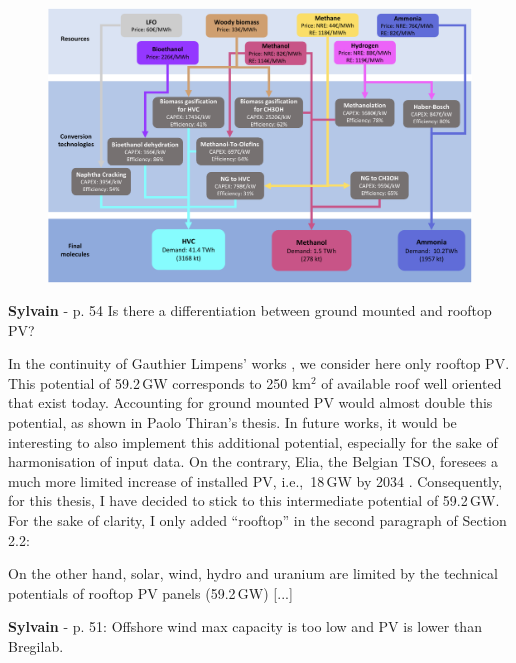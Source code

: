 \documentclass[12pt,a4paper]{article}
\def\ie{i.e.,\ }
\begin{document}
\begin{figure}[htbp!]
\centering
\includegraphics[width=\textwidth]{NED_tech.pdf}
\label{fig:NED_tech}
\end{figure}

\begin{mdframed}[style=comment] %
{\color{purple} \textbf{Sylvain}} - p. 54 Is there a differentiation between ground mounted and rooftop PV?
\end{mdframed}

\noindent In the continuity of Gauthier Limpens' works \cite{limpens2021generating}, we consider here only rooftop PV. This potential of 59.2\,GW corresponds to 250 km$^2$ of available roof well oriented that exist today. Accounting for ground mounted PV would almost double this potential, as shown in Paolo Thiran's thesis. In future works, it would be interesting to also implement this additional potential, especially for the sake of harmonisation of input data. On the contrary, Elia, the Belgian TSO, foresees a much more limited increase of installed PV, \ie 18\,GW by 2034 \cite{Elia_2024_2034}. Consequently, for this thesis, I have decided to stick to this intermediate potential of 59.2\,GW. For the sake of clarity, I only added ``rooftop'' {\color{blue}in the second paragraph of Section 2.2}:

\begin{mdframed}[style=manuscript] %
On the other hand, solar, wind, hydro and uranium are limited by the technical potentials of rooftop PV panels (59.2\,GW) [...]
\end{mdframed}

\begin{mdframed}[style=comment] %
{\color{purple} \textbf{Sylvain}} - p. 51: Offshore wind max capacity is too low and PV is lower than Bregilab.
\end{mdframed}
\end{document}

